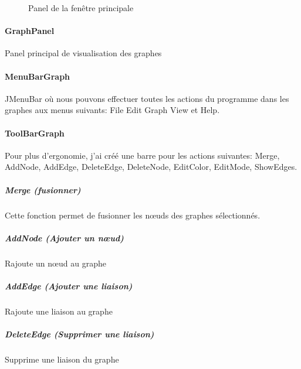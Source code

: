 \documentclass[french]{article}
\begin{document}
	\begin{figure}[h!]
     	\centering
    	\caption{Panel de la fenêtre principale}
	\end{figure}

    \paragraph{GraphPanel}

      Panel principal de visualisation des graphes


    \paragraph{MenuBarGraph}

      JMenuBar où nous pouvons effectuer toutes les actions du programme dans
      les graphes aux menus suivants: File Edit Graph View et Help.


    \paragraph{ToolBarGraph}

	
      Pour plus d'ergonomie, j'ai créé une barre pour les actions suivantes:
       Merge, AddNode, AddEdge, DeleteEdge, DeleteNode, EditColor, EditMode,
      ShowEdges.
      

        


	\subparagraph{ Merge (fusionner) \\} 
	
      Cette fonction permet de fusionner les nœuds des graphes sélectionnés.


    \subparagraph{AddNode (Ajouter un nœud) \\}

      Rajoute un nœud au graphe


    \subparagraph{AddEdge (Ajouter une liaison) \\}

      Rajoute une liaison au graphe


    \subparagraph{DeleteEdge (Supprimer une liaison) \\}

      Supprime une liaison du graphe
\end{document}
